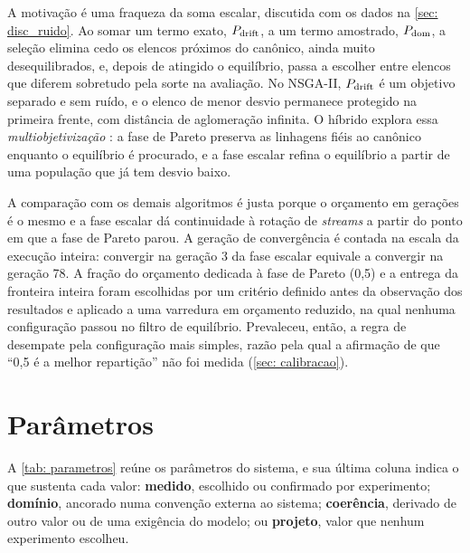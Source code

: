 A motivação é uma fraqueza da soma escalar, discutida com os dados na \autoref{sec: disc_ruido}. Ao somar um termo exato, $P_{\mathrm{drift}}$, a um termo amostrado, $P_{\mathrm{dom}}$, a seleção elimina cedo os elencos próximos do canônico, ainda muito desequilibrados, e, depois de atingido o equilíbrio, passa a escolher entre elencos que diferem sobretudo pela sorte na avaliação. No NSGA-II, $P_{\mathrm{drift}}$ é um objetivo separado e sem ruído, e o elenco de menor desvio permanece protegido na primeira frente, com distância de aglomeração infinita. O híbrido explora essa \textit{multiobjetivização} \cite{knowles2001reducing}: a fase de Pareto preserva as linhagens fiéis ao canônico enquanto o equilíbrio é procurado, e a fase escalar refina o equilíbrio a partir de uma população que já tem desvio baixo.

A comparação com os demais algoritmos é justa porque o orçamento em gerações é o mesmo e a fase escalar dá continuidade à rotação de \textit{streams} a partir do ponto em que a fase de Pareto parou. A geração de convergência é contada na escala da execução inteira: convergir na geração 3 da fase escalar equivale a convergir na geração 78. A fração do orçamento dedicada à fase de Pareto (0,5) e a entrega da fronteira inteira foram escolhidas por um critério definido antes da observação dos resultados e aplicado a uma varredura em orçamento reduzido, na qual nenhuma configuração passou no filtro de equilíbrio. Prevaleceu, então, a regra de desempate pela configuração mais simples, razão pela qual a afirmação de que ``0,5 é a melhor repartição'' não foi medida (\autoref{sec: calibracao}).

\section{Parâmetros}
\label{sec: parametros}

A \autoref{tab: parametros} reúne os parâmetros do sistema, e sua última coluna indica o que sustenta cada valor: \textbf{medido}, escolhido ou confirmado por experimento; \textbf{domínio}, ancorado numa convenção externa ao sistema; \textbf{coerência}, derivado de outro valor ou de uma exigência do modelo; ou \textbf{projeto}, valor que nenhum experimento escolheu.

